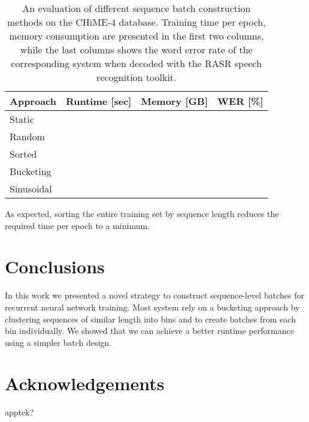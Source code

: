 \documentclass{article}
\begin{document}
	\begin{table}[tbp]
		\centering
		\caption{An evaluation of different sequence batch construction methods on the CHiME-4 database. Training time per epoch, memory consumption are presented in the first two columns, while the last columns shows the word error rate of the corresponding system
		when decoded with the RASR speech recognition toolkit.}
		\label{tab:chime:batch}
		\begin{tabular}{lrrr}
			\hline
			Approach                & Runtime [sec] & Memory [GB] & WER [\%] \\
			\hline
			Static					&				&			  &			 \\
			Random 					&				&			  & 		 \\
			Sorted					& 				&			  &			 \\
			\hline
			Bucketing				&				&			  &			 \\
			Sinusoidal  			&				&			  &			 \\
			\hline
		\end{tabular}
	\end{table}

  As expected, sorting the entire training set by sequence length reduces the required time 
  per epoch to a minimum. 
      
  \section{Conclusions}
    In this work we presented a novel strategy to construct sequence-level batches for recurrent 
    neural network training. Most system rely on a bucketing approach by clustering sequences of similar length into bins and to create batches from each bin individually. We showed that we can achieve a better runtime performance using a simpler batch design.

   \section{Acknowledgements}
 
   apptek?
   
   \ninept
   
   
\end{document}
